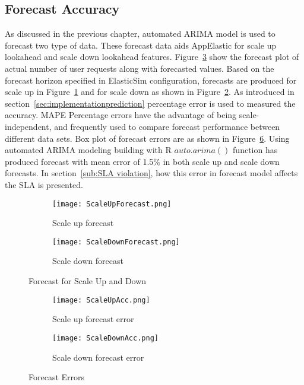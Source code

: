 \subsection{Forecast Accuracy}
\label{sub:Forecast Accuracy}
As discussed in the previous chapter, automated ARIMA model is used to forecast two type of data. These forecast data aids AppElastic for scale up lookahead and scale down lookahead features. Figure~\ref{fig:forecast} show the forecast plot of actual number of user requests along with forecasted values. Based on the forecast horizon specified in ElasticSim configuration, forecasts are produced for scale up in Figure~\ref{figure:forecastscaleup} and for scale down as shown in Figure~\ref{figure:forecastscaledown}. As introduced in section~\ref{sec:implementationprediction} percentage error is used to measured the accuracy. MAPE Percentage errors have the advantage of being scale-independent, and frequently used to compare forecast performance between different data sets. Box plot of forecast errors are as shown in Figure~\ref{fig:forecasterror}. Using automated ARIMA modeling building with R \(auto.arima()\) function has produced forecast with mean error of 1.5\% in both scale up and scale down forecasts. In section~\ref{sub:SLA violation}, how this error in forecast model affects the SLA is presented.
\begin{figure}
     \centering
     \begin{subfigure}[b]{0.9\textwidth}
         \texttt{[image: ScaleUpForecast.png]}
         \caption{Scale up forecast}
         \label{figure:forecastscaleup}
     \end{subfigure}
     \begin{subfigure}[b]{0.9\textwidth}
         \texttt{[image: ScaleDownForecast.png]}
         \caption{Scale down forecast}
         \label{figure:forecastscaledown}
     \end{subfigure}
     \caption{Forecast for Scale Up and Down}
     \label{fig:forecast}
\end{figure}
\begin{figure}
     \centering
     \begin{subfigure}[b]{0.45\textwidth}
         \texttt{[image: ScaleUpAcc.png]}
         \caption{Scale up forecast error}
         \label{figure:forecastscaleuperror}
     \end{subfigure}
     \hfill
     \begin{subfigure}[b]{0.45\textwidth}
         \texttt{[image: ScaleDownAcc.png]}
         \caption{Scale down forecast error}
         \label{figure:forecastscaledownerror}
     \end{subfigure}
     \caption{Forecast Errors}
     \label{fig:forecasterror}
\end{figure}
